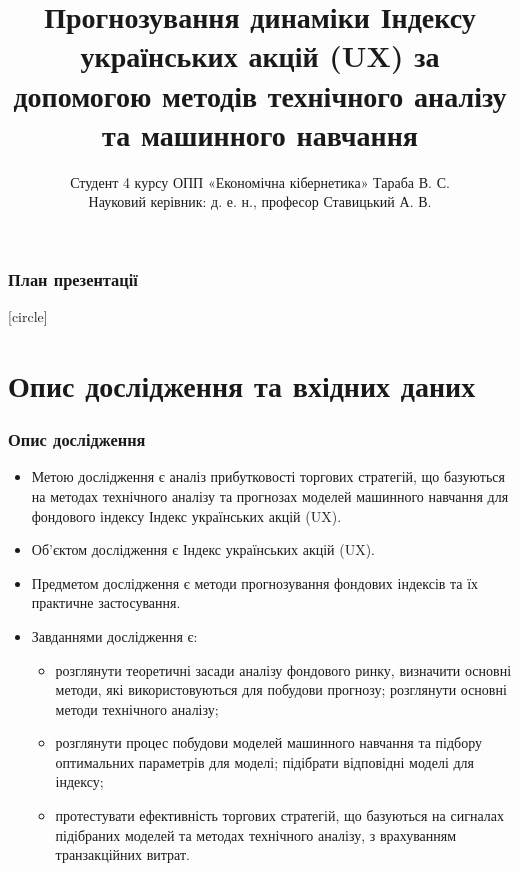 \documentclass[aspectratio=169]{beamer}
\title{Прогнозування динаміки Індексу українських акцій (UX) за допомогою методів технічного аналізу та машинного навчання}
\author{Студент 4 курсу ОПП «Економічна кібернетика» Тараба В. С.\\ Науковий керівник: д. е. н., професор Ставицький А. В.}
\institute{Київський національний університет імені Тараса Шевченка\\Економічний факультет\\Кафедра економічної кібернетики}
\begin{document}
	
\begin{frame}
\titlepage
\end{frame}

\begin{frame}
\frametitle{План презентації}
[circle]
\tableofcontents
\end{frame}

\section{Опис дослідження та вхідних даних}

\begin{frame}
\frametitle{Опис дослідження}
\begin{itemize}
\item \alert {Метою дослідження}  є  аналіз  прибутковості  торгових  стратегій, що базуються  на  методах технічного аналізу та прогнозах  моделей  машинного навчання для  фондового індексу Індекс українських акцій (UX).
\tinyskip
\item \alert {Об’єктом дослідження} є Індекс українських акцій (UX).
\tinyskip
\item \alert {Предметом дослідження} є методи прогнозування фондових індексів та їх практичне застосування.
\tinyskip
\item \alert {Завданнями дослідження} є:
\begin{itemize}
    \item[\textcolor{orange}{\textbullet}] розглянути теоретичні засади аналізу фондового ринку, визначити основні методи, які використовуються для побудови прогнозу; розглянути основні методи технічного аналізу; 
    \item[\textcolor{orange}{\textbullet}] розглянути процес побудови  моделей машинного навчання та підбору оптимальних параметрів для моделі; підібрати відповідні моделі для індексу; 
    \item[\textcolor{orange}{\textbullet}] протестувати ефективність торгових стратегій, що базуються на сигналах підібраних  моделей та методах технічного аналізу, з врахуванням транзакційних витрат. 
\end{itemize}
\end{itemize}
\end{frame}
\end{document}
